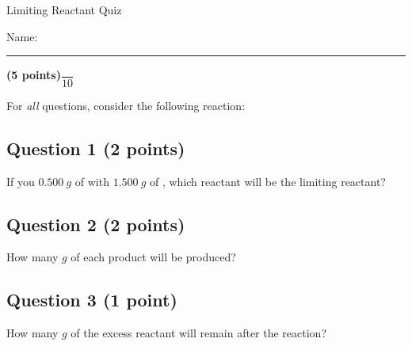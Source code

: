 \documentclass[12pt, letterpaper]{memoir}
\begin{document}
	\begin{center}
		{\large Limiting Reactant Quiz}
	\end{center}
	{\large Name: \rule[-1mm]{4in}{.1pt} {\bfseries (5 points)}\hspace{4em}$\dfrac{~}{10}$} 
	
	\noindent
	For \emph{all} questions, consider the following reaction: 
	
	\subsection*{Question 1 (2 points)}
	If you $0.500~g$ of  with $1.500~g$ of , which reactant will be the limiting reactant?
	
	\vspace{13em}
	\subsection*{Question 2 (2 points)}
	How many $g$ of each product will be produced?
	
	\vspace{13em}
	\subsection*{Question 3 (1 point)} 
	How many $g$ of the excess reactant will remain after the reaction?
\end{document}

